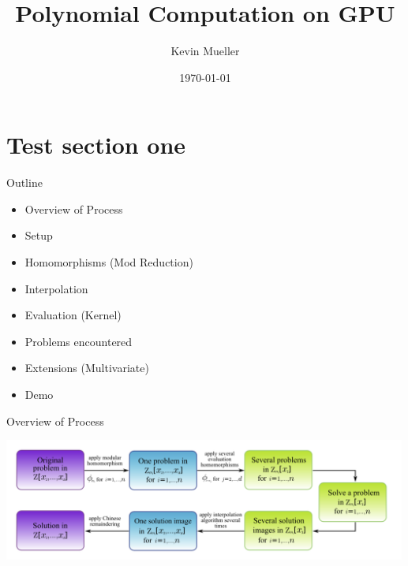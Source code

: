 \documentclass{beamer}
\title[GPU polynomial computation]{Polynomial Computation on GPU} %
\author{Kevin Mueller} %
\institute[UW] %
{
	\\ %
	\medskip
}
\date{\today} %
\begin{document}
	
	\begin{frame}
		\maketitle
	
		
	\end{frame}
	
	\section{Test section one}
	\begin{frame}{Outline}
	
		\vspace{0.2in}
		\begin{itemize}
			\item Overview of Process
			\item Setup
			\item Homomorphisms (Mod Reduction)
			\item Interpolation 
			\item Evaluation (Kernel)
			\item Problems encountered
			\item Extensions (Multivariate)
			\item Demo
		\end{itemize}
		
	\end{frame}
	
	
	\begin{frame}{	Overview of Process}

	
	
		\includegraphics[width=0.995\textwidth]{../Code/Images/diagram_homomorphisms.png}
	
	\end{frame}
	
\end{document}
